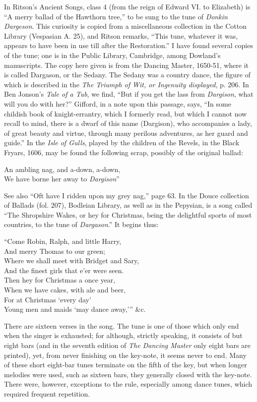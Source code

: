 In Ritson’s Ancient Songs, class 4 (from the reign of Edward VI. to Elizabeth)
is “A merry ballad of the Hawthorn tree,” to be sung to the tune of \textit{Donkin
Dargeson}. This curiosity is copied from a miscellaneous collection in the Cotton
Library (Vespasian A. 25), and Ritson remarks, “This tune, whatever it was,
appears to have been in use till after the Restoration.” I have found several
copies of the tune; one is in the Public Library, Cambridge, among Dowland’s
manuscripts. The copy here given is from the Dancing Master, 1650-51, where
it is called Dargason, or the Sedany. The Sedany was a country dance, the figure
of which is described in the \textit{The Triumph of Wit, or Ingenuity displayed}, p. 206.
In Ben Jonson’s \textit{Tale of a Tub}, we find, “But if you get the lass from \textit{Dargison},
what will you do with her?” Gifford, in a note upon this passage, says, “In
some childish book of knight-errantry, which I formerly read, but which I cannot
now recall to mind, there is a dwarf of this name (Dargison), who accompanies a
lady, of great beauty and virtue, through many perilous adventures, as her guard
and guide.” In the \textit{Isle of Gulls}, played by the children of the Revels, in the
Black Fryars, 1606, may be found the following scrap, possibly of the original
ballad:
\begin{scverse}An ambling nag, and a-down, a-down,\\
We have borne her away to \textit{Dargison}”
\end{scverse}
See also “Oft have I ridden upon my grey nag,” page 63. In the Douce collection
of Ballads (fol. 207), Bodleian Library, as well as in the Pepysian, is a song
called “The Shropshire Wakes, or hey for Christmas, being the delightful sports
of most countries, to the tune of \textit{Dargason}.” It begins thus:
\begin{scverse}“Come Robin, Ralph, and little Harry,\\
And merry Thomas to our green;\\
Where we shall meet with Bridget and Sary,\\
And the finest girls that e’er were seen.\\
Then hey for Christmas a once year,\\
When we have cakes, with ale and beer,\\
For at Christmas ‘every day’\\
Young men and maids ‘may dance away,’” \&c.
\end{scverse}
\pagebreak
There are sixteen verses in the song. The tune is one of those which only end
when the singer is exhausted; for although, strictly speaking, it consists of but
eight bars (and in the seventh edition of \textit{The Dancing Master }only eight bars are
printed), yet, from never finishing on the key-note, it seems never to end. Many
of these short eight-bar tunes terminate on the fifth of the key, but when longer
melodies were used, such as sixteen bars, they generally closed with the key-note.
There were, however, exceptions to the rule, especially among dance tunes, which
required frequent repetition.

